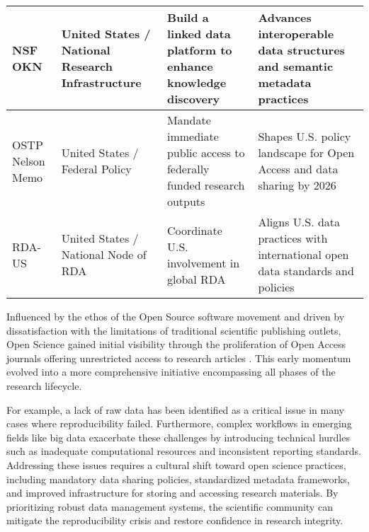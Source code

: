 \begin{table}[H]
\begin{tabularx}{\textwidth}{|X|X|X|X|}
        \hline
        NSF OKN             & United States / National Research Infrastructure & Build a linked data platform to enhance knowledge discovery          & Advances interoperable data structures and semantic metadata practices           \\
        \hline
        OSTP Nelson Memo    & United States / Federal Policy                   & Mandate immediate public access to federally funded research outputs & Shapes U.S. policy landscape for Open Access and data sharing by 2026            \\
        \hline
        RDA-US              & United States / National Node of RDA             & Coordinate U.S. involvement in global RDA                            & Aligns U.S. data practices with international open data standards and policies   \\
        \hline
    \end{tabularx}
\end{table}




Influenced by the ethos of the Open Source software movement and driven by dissatisfaction with the limitations of traditional scientific publishing outlets, Open Science gained initial visibility through the proliferation of Open Access journals offering unrestricted access to research articles \cite{laakso_anatomy_2012}. This early momentum evolved into a more comprehensive initiative encompassing all phases of the research lifecycle.

For example, a lack of raw data has been identified as a critical issue in many cases where reproducibility failed. Furthermore, complex workflows in emerging fields like big data exacerbate these challenges by introducing technical hurdles such as inadequate computational resources and inconsistent reporting standards. Addressing these issues requires a cultural shift toward open science practices, including mandatory data sharing policies, standardized metadata frameworks, and improved infrastructure for storing and accessing research materials. By prioritizing robust data management systems, the scientific community can mitigate the reproducibility crisis and restore confidence in research integrity.


